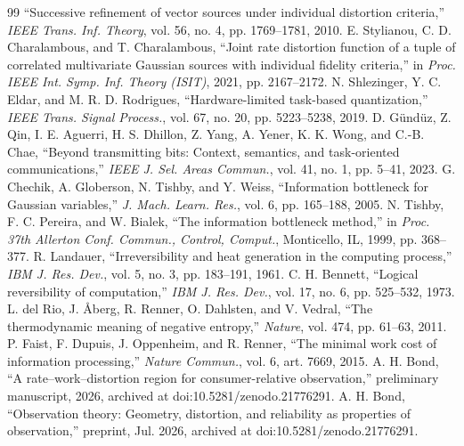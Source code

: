 ﻿\documentclass[11pt,onecolumn]{IEEEtran}
\begin{document}
\begin{thebibliography}{99}
``Successive refinement of vector sources under individual distortion
criteria,'' \emph{IEEE Trans. Inf. Theory}, vol. 56, no. 4, pp. 1769--1781,
2010.
 E. Stylianou, C. D. Charalambous, and
T. Charalambous, ``Joint rate distortion function of a tuple of correlated
multivariate Gaussian sources with individual fidelity criteria,'' in
\emph{Proc. IEEE Int. Symp. Inf. Theory (ISIT)}, 2021, pp. 2167--2172.
 N. Shlezinger, Y. C. Eldar, and M. R. D. Rodrigues,
``Hardware-limited task-based quantization,'' \emph{IEEE Trans. Signal
Process.}, vol. 67, no. 20, pp. 5223--5238, 2019.
 D. G\"und\"uz, Z. Qin, I. E. Aguerri, H. S. Dhillon,
Z. Yang, A. Yener, K. K. Wong, and C.-B. Chae, ``Beyond transmitting bits:
Context, semantics, and task-oriented communications,'' \emph{IEEE J. Sel.
Areas Commun.}, vol. 41, no. 1, pp. 5--41, 2023.
 G. Chechik, A. Globerson, N. Tishby, and Y. Weiss,
``Information bottleneck for Gaussian variables,'' \emph{J. Mach. Learn.
Res.}, vol. 6, pp. 165--188, 2005.
 N. Tishby, F. C. Pereira, and W. Bialek, ``The
information bottleneck method,'' in \emph{Proc. 37th Allerton Conf. Commun.,
Control, Comput.}, Monticello, IL, 1999, pp. 368--377.
 R. Landauer, ``Irreversibility and heat generation in
the computing process,'' \emph{IBM J. Res. Dev.}, vol. 5, no. 3, pp. 183--191,
1961.
 C. H. Bennett, ``Logical reversibility of computation,''
\emph{IBM J. Res. Dev.}, vol. 17, no. 6, pp. 525--532, 1973.
 L. del Rio, J. \AA berg, R. Renner, O. Dahlsten, and
V. Vedral, ``The thermodynamic meaning of negative entropy,'' \emph{Nature},
vol. 474, pp. 61--63, 2011.
 P. Faist, F. Dupuis, J. Oppenheim, and R. Renner, ``The
minimal work cost of information processing,'' \emph{Nature Commun.}, vol. 6,
art. 7669, 2015.
 A. H. Bond, ``A rate--work--distortion region for
consumer-relative observation,'' preliminary manuscript, 2026, archived at
doi:10.5281/zenodo.21776291.
 A. H. Bond, ``Observation theory: Geometry,
distortion, and reliability as properties of observation,'' preprint,
Jul. 2026, archived at doi:10.5281/zenodo.21776291. %
\end{thebibliography}
\end{document}
